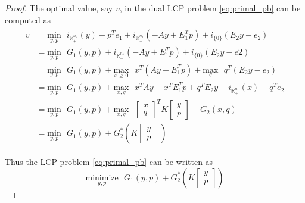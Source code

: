 \documentclass{article} %
\begin{document}
\begin{proof}
The optimal value, say $v$, in the dual LCP problem \eqref{eq:primal_pb} can be computed as 
\begin{eqnarray*}
  \begin{aligned}
    v &= \underset{y,p}{\text{min}}\text{ }i_{\mathbb{R}^{n_2}_+}(y) + p^Te_1 + i_{\mathbb{R}^{n_1}_+}(-Ay + E_1^Tp) + i_{\{0\}}(E_2y - e_2)\\
    &= \underset{y,p}{\text{min}}\text{ }G_1(y,p) + i_{\mathbb{R}^{n_1}_+}(-Ay + E_1^Tp) + i_{\{0\}}(E_2y - e2)\\
    &= \underset{y,p}{\text{min}}\text{ }G_1(y,p) + \underset{x \geq 0}{\text{max}}\text{ }x^T(Ay - E_1^Tp) + \underset{q}{\text{max}}\text{ }q^T(E_2y - e_2)\\
    &= \underset{y,p}{\text{min}}\text{ }G_1(y,p) + \underset{x, q}{\text{max}}\text{ }x^TAy - x^TE_1^Tp + q^TE_2y - i_{\mathbb{R}^{n_1}_+}(x) - q^Te_2\\
    &= \underset{y,p}{\text{min}}\text{ }G_1(y,p) + \underset{x,q}{\text{max}}\text{ }\begin{bmatrix}x\\q\end{bmatrix}^TK\begin{bmatrix}y\\p\end{bmatrix} - G_2(x, q) \\
      &= \underset{y,p}{\text{min}}\text{ }G_1(y,p) + G_2^*\left(K\begin{bmatrix}y\\p\end{bmatrix}\right)
  \end{aligned}
  \label{eq:a}
\end{eqnarray*}

Thus the LCP problem \eqref{eq:primal_pb} can be written as 
\begin{equation}
  \underset{y,p}{\text{minimize}}\text{ }G_1(y,p) + G_2^*\left(K\begin{bmatrix}y\\p\end{bmatrix}\right)
\end{equation}


\end{proof}
\end{document}
